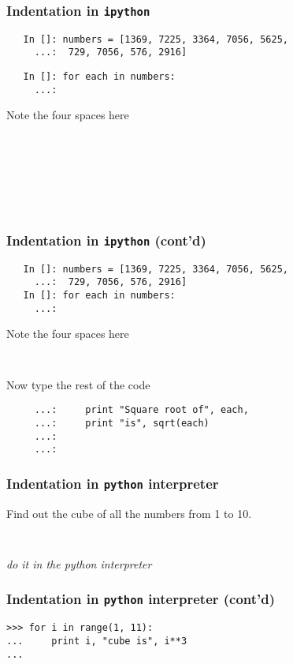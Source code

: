 \documentclass[presentation]{beamer}
\begin{document}
\begin{frame}[fragile]
\frametitle{Indentation in \texttt{ipython}}
\label{sec-8}

\begin{verbatim}
   In []: numbers = [1369, 7225, 3364, 7056, 5625, 
     ...:  729, 7056, 576, 2916]
\end{verbatim}


\begin{verbatim}
   In []: for each in numbers:
     ...:     
\end{verbatim}

  Note the four spaces here
\begin{verbatim}
   
   
   
   
   
   
\end{verbatim}
\end{frame}
\begin{frame}[fragile]
\frametitle{Indentation in \texttt{ipython} (cont'd)}
\label{sec-9}

\begin{verbatim}
   In []: numbers = [1369, 7225, 3364, 7056, 5625, 
     ...:  729, 7056, 576, 2916]
   In []: for each in numbers:
     ...:     
\end{verbatim}

  Note the four spaces here
\begin{verbatim}
   
\end{verbatim}

  Now type the rest of the code
\begin{verbatim}
     ...:     print "Square root of", each, 
     ...:     print "is", sqrt(each)
     ...:     
     ...:     
\end{verbatim}
\end{frame}
\begin{frame}[fragile]
\frametitle{Indentation in \texttt{python} interpreter}
\label{sec-10}

  Find out the cube of all the numbers from 1 to 10.
\begin{verbatim}
   
\end{verbatim}

  \emph{do it in the python interpreter}
\end{frame}
\begin{frame}[fragile]
\frametitle{Indentation in \texttt{python} interpreter (cont'd)}
\label{sec-11}

\begin{verbatim}
>>> for i in range(1, 11):
...     print i, "cube is", i**3
...
\end{verbatim}
\end{frame}
\end{document}
